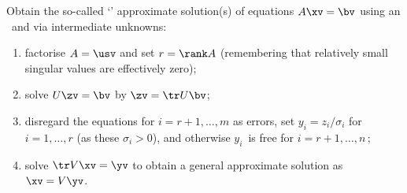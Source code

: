 \begin{procedure}\label{pro:appsol}
    Obtain the so-called `' approximate solution(s) of  equations $A\xv=\bv$ using an \svd\ and via intermediate unknowns:
    \begin{enumerate}
    \item \label{as:a0} factorise \(A=\usv\) and set \(r=\rank A\) (remembering that relatively small singular values are effectively zero);
        \item \label{as:a1} solve \(U\zv=\bv\) by $\zv=\tr U\bv$;
    
        \item \label{as:a2} disregard the equations for \(i=r+1,\ldots,m\) as errors, set $y_i=z_i/\sigma_i$ for $i=1,\ldots,r$  (as these $\sigma_i> 0$), and otherwise $y_i$~is free for $i=r+1,\ldots,n$\,; 
    
        \item \label{as:a4} solve \(\tr V\xv=\yv\) to obtain a general approximate solution as $\xv=V\yv$.
    \end{enumerate}
\end{procedure}




